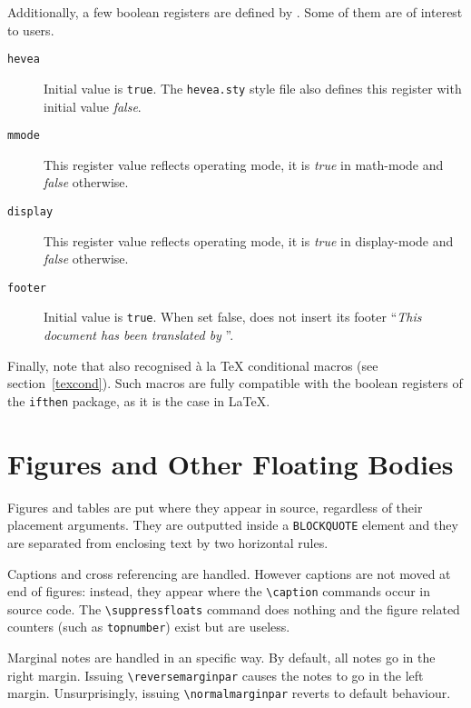Additionally, a few boolean registers are defined by \hevea{}.
Some of them are of interest to users.
\begin{description}
\item[\texttt{hevea}] Initial value is \texttt{true}.
The \texttt{hevea.sty} style file also defines this register with
initial value \textit{false}.
\item[\texttt{mmode}] This register value reflects \hevea{} operating
mode, it is \textit{true} in math-mode and \textit{false} otherwise.
\item[\texttt{display}]  This register value reflects \hevea{} operating
mode, it is \textit{true} in display-mode and \textit{false} otherwise.
\item[\texttt{footer}] Initial value is  \texttt{true}.
When set false, \hevea{} does not insert its footer ``\emph{This
document has been translated by \hevea}''.

\end{description}

Finally, note that \hevea{} also recognised \`a la \TeX{} conditional
macros (see section~\ref{texcond}). Such macros are fully compatible
with the boolean registers of the \texttt{ifthen} package, as it is
the case in \LaTeX.


\section{Figures and Other Floating Bodies}

Figures and tables are put where they appear in source, regardless of
their placement arguments.
They are outputted  inside a \verb+BLOCKQUOTE+ element and they are
separated from enclosing text by two
horizontal rules.

Captions and cross referencing are handled.
However captions are not moved at end of figures: instead, they appear
where the \verb+\caption+ commands occur in source code.
The \verb+\suppressfloats+ command does nothing and the
figure related counters (such as \verb+topnumber+) exist but are useless.

%
%
%
\reversemarginpar%
\normalmarginpar%
Marginal notes are handled in an \hevea{} specific way.
By default, all notes go in the right margin.
Issuing \verb+\reversemarginpar+ causes the notes to go in the left
margin. Unsurprisingly, issuing \verb+\normalmarginpar+ reverts to
default behaviour.

